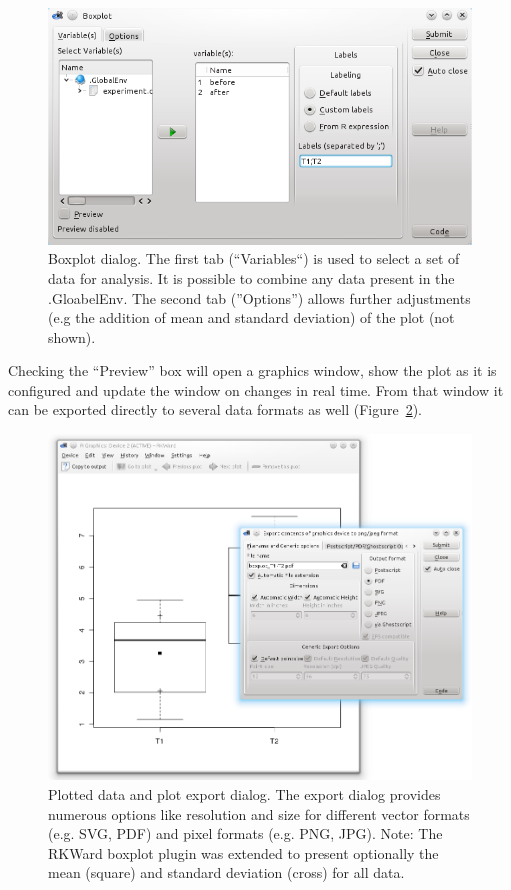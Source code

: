 \begin{figure}[htp]
 \centering
 \includegraphics[width=15.5cm]{../figures/boxplot1.png}
 \caption{Boxplot dialog. The first tab (``Variables``) is used to select a set of data for analysis. It is possible to
  combine any data present in the .GloabelEnv. The second tab (''Options'') allows further adjustments (e.g the addition
  of mean and standard deviation) of the plot (not shown).}
 \label{fig:boxplot1}
\end{figure}

Checking the ``Preview'' box will open a graphics window, show the plot as
it is configured and update the window on changes in real time. From
that window it can be exported directly to several data formats as
well (Figure~\ref{fig:boxplot2}).

\begin{figure}[htp]
 \centering
 \includegraphics[width=15.5cm]{../figures/boxplot2.png}
 \caption{Plotted data and plot export dialog. The export dialog provides numerous 
  options like resolution and size for different vector formats (e.g. SVG, PDF) and 
  pixel formats (e.g. PNG, JPG). Note: The RKWard boxplot plugin was extended to present optionally 
  the mean (square) and standard deviation (cross) for all data.}
 \label{fig:boxplot2}
\end{figure}
